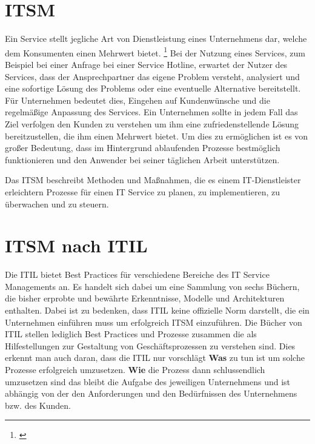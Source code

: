 \section{\acl{ITSM}}
Ein Service stellt jegliche Art von Dienstleistung eines Unternehmens dar, welche dem Konsumenten einen Mehrwert bietet.
\footnote{\cite[Def. von Service][S.10]{Farenden2012}}
\newline
Bei der Nutzung eines Services, zum Beispiel bei einer Anfrage bei einer Service Hotline, erwartet der Nutzer des Services, dass der Ansprechpartner das eigene Problem versteht, analysiert und eine
sofortige Lösung des Problems oder eine eventuelle Alternative bereitstellt.
Für Unternehmen bedeutet dies, Eingehen auf Kundenwünsche und die regelmäßige Anpassung des Services.
Ein Unternehmen sollte in jedem Fall das Ziel verfolgen den Kunden zu verstehen um ihm eine zufriedenstellende Lösung bereitzustellen, die ihm einen Mehrwert bietet.
Um dies zu ermöglichen ist es von großer Bedeutung, dass im Hintergrund ablaufenden Prozesse bestmöglich funktionieren und den Anwender bei seiner täglichen Arbeit unterstützen.

Das \ac{ITSM} beschreibt Methoden und Maßnahmen, die es einem IT-Dienstleister erleichtern Prozesse für einen IT Service zu planen, zu implementieren, zu überwachen und zu steuern.
\section{\acl{ITSM} nach \acs{ITIL}}
Die \ac{ITIL} bietet Best Practices für verschiedene Bereiche des IT Service Managements an.
Es handelt sich dabei um eine Sammlung von sechs Büchern, die bisher erprobte und bewährte Erkenntnisse, Modelle und Architekturen enthalten.
Dabei ist zu bedenken, dass \ac{ITIL} keine offizielle Norm darstellt, die ein Unternehmen einführen muss um erfolgreich \ac{ITSM} einzuführen.
Die Bücher von \ac{ITIL} stellen lediglich Best Practices und Prozesse zusammen die als Hilfestellungen zur Gestaltung von Geschäftsprozessen zu verstehen sind.
Dies erkennt man auch daran, dass die \ac{ITIL} nur vorschlägt \textbf{Was} zu tun ist um solche Prozesse erfolgreich umzusetzen.
\textbf{Wie} die Prozess dann schlussendlich umzusetzen sind das bleibt die Aufgabe des jeweiligen Unternehmens und ist abhängig von der den Anforderungen und den Bedürfnissen des Unternehmens bzw. des Kunden.

